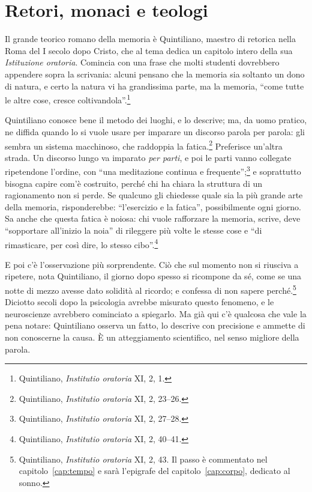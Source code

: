 \section{Retori, monaci e teologi}

Il grande teorico romano della memoria è Quintiliano, maestro di
retorica nella Roma del I secolo dopo Cristo, che al tema dedica un
capitolo intero della sua \emph{Istituzione oratoria}. Comincia con una
frase che molti studenti dovrebbero appendere sopra la scrivania:
alcuni pensano che la memoria sia soltanto un dono di natura, e certo
la natura vi ha grandissima parte, ma la memoria, \enquote{come tutte
le altre cose, cresce coltivandola}.\footnote{Quintiliano,
\emph{Institutio oratoria} XI, 2, 1.}

Quintiliano conosce bene il metodo dei luoghi, e lo descrive; ma, da
uomo pratico, ne diffida quando lo si vuole usare per imparare un
discorso parola per parola: gli sembra un sistema macchinoso, che
raddoppia la fatica.\footnote{Quintiliano, \emph{Institutio oratoria}
XI, 2, 23--26.} Preferisce un'altra strada. Un discorso lungo va
imparato \emph{per parti}, e poi le parti vanno collegate ripetendone
l'ordine, con \enquote{una meditazione continua e
frequente};\footnote{Quintiliano, \emph{Institutio oratoria} XI, 2,
27--28.} e soprattutto bisogna capire com'è costruito, perché chi ha
chiara la struttura di un ragionamento non si perde. Se qualcuno gli
chiedesse quale sia la più grande arte della memoria, risponderebbe:
\enquote{l'esercizio e la fatica}, possibilmente ogni giorno. Sa anche
che questa fatica è noiosa: chi vuole rafforzare la memoria, scrive,
deve \enquote{sopportare all'inizio la noia} di rileggere più volte le
stesse cose e \enquote{di rimasticare, per così dire, lo stesso
cibo}.\footnote{Quintiliano, \emph{Institutio oratoria} XI, 2, 40--41.}

E poi c'è l'osservazione più sorprendente. Ciò che sul momento non si
riusciva a ripetere, nota Quintiliano, il giorno dopo spesso si
ricompone da sé, come se una notte di mezzo avesse dato solidità al
ricordo; e confessa di non sapere perché.\footnote{Quintiliano,
\emph{Institutio oratoria} XI, 2, 43. Il passo è commentato nel
capitolo~\ref{cap:tempo} e sarà l'epigrafe del
capitolo~\ref{cap:corpo}, dedicato al sonno.} Diciotto secoli dopo la
psicologia avrebbe misurato questo fenomeno, e le neuroscienze
avrebbero cominciato a spiegarlo. Ma già qui c'è qualcosa che vale la
pena notare: Quintiliano osserva un fatto, lo descrive con precisione e
ammette di non conoscerne la causa. È un atteggiamento scientifico, nel
senso migliore della parola.

